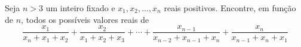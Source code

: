 Seja $n > 3$ um inteiro fixado e $x_1, x_2, \dots, x_n$ reais positivos. Encontre, em função de $n$, todos os possíveis valores reais de
$$\frac{x_1}{x_n+x_1+x_2}
+ \frac{x_2}{x_1+x_2+x_3}
+ \cdots
+ \frac{x_{n-1}}{x_{n-2}+x_{n-1}+x_n}
+ \frac{x_n}{x_{n-1}+x_n+x_1}$$